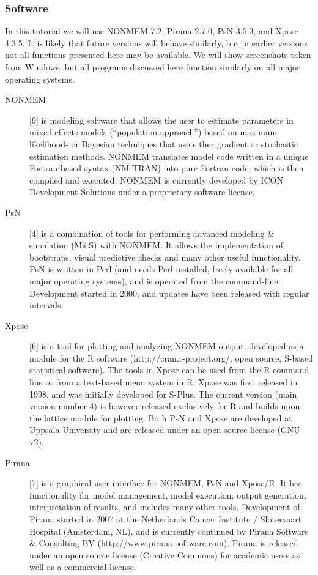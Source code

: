 \subsubsection{Software}
In this tutorial we will use NONMEM 7.2, Pirana
2.7.0, PsN 3.5.3, and Xpose 4.3.5. It is likely that future versions
will behave similarly, but in earlier versions not all functions
presented here may be available. We will show screenshots taken from
Windows, but all programs discussed here function similarly on all
major operating systems.

\begin{description}

\item [NONMEM] [9] is modeling software that allows the user to estimate
parameters in mixed-effects models (“population approach”) based on
maximum likelihood- or Bayesian techniques that use either gradient or
stochastic estimation methods. NONMEM translates model code written in
a unique Fortran-based syntax (NM-TRAN) into pure Fortran code, which
is then compiled and executed. NONMEM is currently developed by ICON
Development Solutions under a proprietary software license.

\item[PsN] [4] is a combination of tools for performing advanced modeling \&
simulation (M\&S) with NONMEM. It allows the implementation of
bootstraps, visual predictive checks and many other useful
functionality. PsN is written in Perl (and needs Perl installed,
freely available for all major operating systems), and is operated
from the command-line. Development started in 2000, and updates have
been released with regular intervals.

\item[Xpose] [6] is a tool for plotting and analyzing NONMEM output,
developed as a module for the R software (http://cran.r-project.org/,
open source, S-based statistical software). The tools in Xpose can be
used from the R command line or from a text-based menu system in
R. Xpose was first released in 1998, and was initially developed for
S-Plus. The current version (main version number 4) is however
released exclusively for R and builds upon the lattice module for
plotting. Both PsN and Xpose are developed at Uppsala University and
are released under an open-source license (GNU v2).

\item[Pirana] [7] is a graphical user interface for NONMEM, PsN and
Xpose/R. It has functionality for model management, model execution,
output generation, interpretation of results, and includes many other
tools. Development of Pirana started in 2007 at the Netherlands Cancer
Institute / Slotervaart Hospital (Amsterdam, NL), and is currently
continued by Pirana Software \& Consulting BV
(http://www.pirana-software.com). Pirana is released under an open
source license (Creative Commons) for academic users as well as a
commercial license. 

\end{description}

